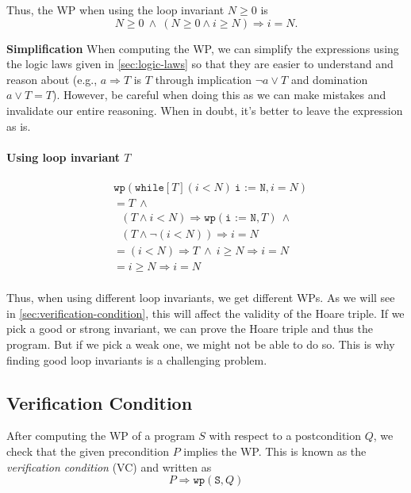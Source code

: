 \documentclass[oneside,11pt,dvipsnames]{book}
\newenvironment{commentbox}[1][]{
  \small
  \begin{mybox}
    {\small \textbf{#1}}
  }{
  \end{mybox}
}
\renewcommand{\implies}{\Rightarrow}
\newcommand{\code}[1]{\texttt{#1}}
\begin{document}
Thus, the WP when using the loop invariant $N \ge 0$ is 
\[ N \ge 0 ~\land~ (N \ge 0  \land i \ge N)  \implies i = N. \]


\begin{commentbox}{\textbf{Simplification}}
    When computing the WP, we can simplify the expressions using the logic laws given in \autoref{sec:logic-laws} so that they are easier to understand and reason about (e.g., $a \implies T$ is $T$ through implication $\neg a \lor T$ and domination $a \lor T = T$). However, be careful when doing this as we can make mistakes and invalidate our entire reasoning.  When in doubt, it's better to leave the expression as is.
\end{commentbox}


\paragraph{Using loop invariant $T$}

\begin{equation*}
    \begin{split}
        &\code{wp}(\code{while}[T] (i < N ) ~\code{i := N}, i = N)\\
    &= T ~\land  \\
    &~~~ (T \land  i < N) \implies \code{wp}(\code{i := N}, T) ~\land \\
    &~~~ (T \land \neg(i < N))  \implies i = N\\ 
    & = (i < N) \implies T ~\land~ i \ge N \implies i = N\\
    & = i \ge N \implies i = N \\
\end{split}
\end{equation*}

Thus, when using different loop invariants, we get different WPs. As we will see in \autoref{sec:verification-condition}, this will affect the validity of the Hoare triple.
If we pick a good or strong invariant, we can prove the Hoare triple and thus the program.  But if we pick a weak one, we might not be able to do so.  This is why finding good loop invariants is a challenging problem.


\subsection{Verification Condition}\label{sec:verification-condition} 

After computing the WP of a program $S$ with respect to a postcondition $Q$, we check that the given precondition $P$ implies the WP.  This is known as the \emph{verification condition} (VC) and written as 
\begin{equation}\label{eq:vc}
    P \implies \code{wp}(\code{S},Q)
\end{equation}
\end{document}
